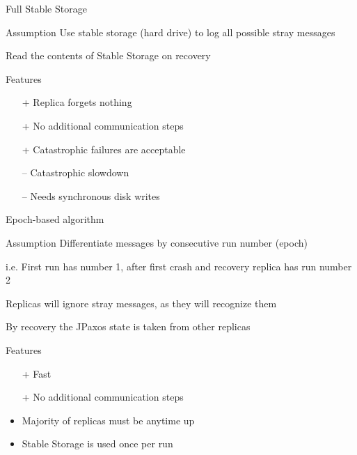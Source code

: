 \documentclass[hyperref={pdfpagelabels=true},11pt,compress,trans]{beamer}
\begin{document}
\begin{frame}{Full Stable Storage}
 \begin{block}{Assumption}
  Use stable storage (hard drive) to log all possible stray messages
  
  Read the contents of Stable Storage on recovery
 \end{block}

 \begin{block}{Features}
  \vspace{-1em}\vspace{-\parskip}\vspace{-\lineskip}
  \begin{itemize}
   \item[+]  Replica forgets nothing
   \item[+]  No additional communication steps
   \item[+]  Catastrophic failures are acceptable
   \item[--] Catastrophic slowdown
   \item[--] Needs synchronous disk writes
  \end{itemize}
 \end{block}
\end{frame}

\begin{frame}{Epoch-based algorithm}
 \begin{block}{Assumption}
  Differentiate messages by consecutive run number (epoch)

{\footnotesize i.e. First run has number 1, after first crash and recovery replica has run number 2}

  Replicas will ignore stray messages, as they will recognize them

  By recovery the JPaxos state is taken from other replicas
 \end{block}
 \begin{block}{Features}
  \vspace{-1em}\vspace{-\parskip}\vspace{-\lineskip}
  \begin{itemize}
   \item[+]  Fast
   \item[+]  No additional communication steps
   \item     Majority of replicas must be anytime up
   \item     Stable Storage is used once per run
  \end{itemize}
 \end{block}
\end{frame}
\end{document}
